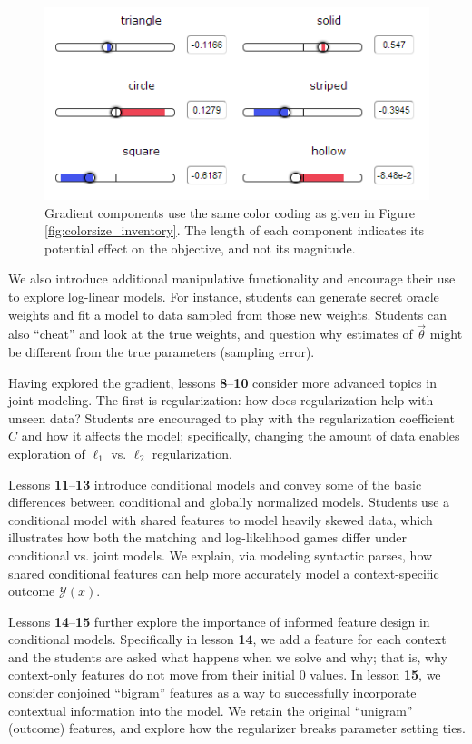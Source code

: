 \documentclass[11pt,letterpaper]{article}
\begin{document}
\begin{figure}[t]
\centering
\small
\includegraphics[scale=.65]{images/gradient-lesson7.PNG}
\caption{Gradient components use the same color coding as given in Figure \ref{fig:colorsize_inventory}. The length of each component indicates its potential effect on the objective, and not its magnitude.}
\label{fig:gradients}
\end{figure}

We also introduce additional manipulative functionality and encourage their use to 
explore log-linear models. For instance, students can generate secret oracle weights and 
fit a model to data sampled from those new weights. Students can also ``cheat'' and look at the true 
weights,  and question why estimates of $\vec{\theta}$ might be different from the true parameters 
(sampling error).

Having explored the gradient, lessons \textbf{8}--\textbf{10} consider more advanced topics in joint 
modeling. The first is regularization: how does regularization help with unseen data? Students are encouraged 
to play with the regularization coefficient $C$ and how it affects the model; specifically, changing the amount 
of data enables exploration of $\ell_1$ vs. $\ell_2$ regularization.

Lessons \textbf{11}--\textbf{13} introduce conditional models and convey some of the basic differences between 
conditional and globally normalized models. Students use a conditional model with shared features to model 
heavily skewed data, which illustrates how both the matching and log-likelihood games differ under conditional vs. 
joint models. We explain, via modeling syntactic parses, how shared conditional features can help more accurately 
model a context-specific outcome $\mathcal{Y}(x)$.

Lessons \textbf{14}--\textbf{15} further explore the importance of informed feature design in conditional models. 
Specifically in lesson \textbf{14}, we add a feature for each context and the students are asked what happens 
when we solve and why; that is, why context-only features do not move from their initial 0 values. 
In lesson \textbf{15}, we consider conjoined ``bigram'' features as a way to successfully incorporate 
contextual information into the model. We retain the original ``unigram'' (outcome) features, and explore
how the regularizer breaks parameter setting ties.
\end{document}
